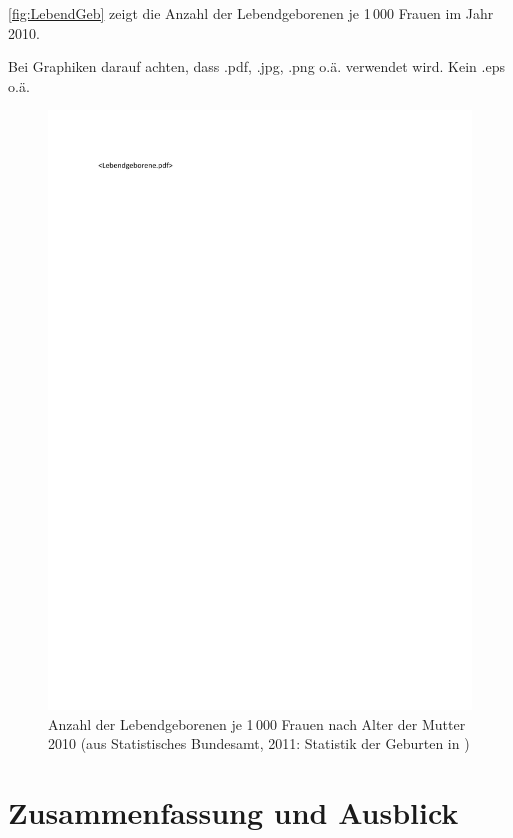 \documentclass[a4paper,fontsize=11pt,parskip=off,open=any,bibtotoc,headings=normal,appendixrefix=true,listof=totoc]{scrbook}
\makeatletter
\let\citet\cite
\renewcommand\section{\@startsection{section}{1}{\z@}%
  {-.5\baselineskip}%
  {.5\baselineskip}%
  {\ifnum \scr@compatibility>\@nameuse{scr@v@2.96}\relax
    \setlength{\parfillskip}{\z@ plus 1fil}\fi
    \raggedsection\normalfont\sectfont\nobreak\size@section}%
}
\makeatother
\begin{document}
\autoref{fig:LebendGeb} zeigt die Anzahl der Lebendgeborenen je 1\,000 Frauen im Jahr 2010.

Bei Graphiken darauf achten, dass .pdf, .jpg, .png o.ä. verwendet wird. Kein .eps o.ä.

\begin{figure}[h]
\centering
\includegraphics[width=.75\textwidth]{Lebendgeborene.pdf}
\caption[Anzahl der Lebendgeborenen je 1\,000 Frauen 2010]{Anzahl der Lebendgeborenen je 1\,000 Frauen nach Alter der Mutter 2010 (aus
Statistisches Bundesamt, 2011: Statistik der Geburten in
\citet[16]{BundesministeriumfuerFamilie2011})}
\label{fig:LebendGeb}
\end{figure}


\chapter{Zusammenfassung und Ausblick}
\label{zusammenfassung}



{
\RaggedRight
\printbibliography
}
\end{document}
